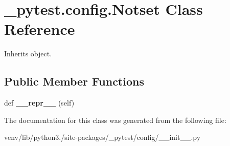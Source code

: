 \hypertarget{class__pytest_1_1config_1_1_notset}{}\section{\+\_\+pytest.\+config.\+Notset Class Reference}
\label{class__pytest_1_1config_1_1_notset}


Inherits object.

\subsection*{Public Member Functions}
\begin{DoxyCompactItemize}
\item 
\mbox{\label{class__pytest_1_1config_1_1_notset_ac13b0907cd677db6e1eb5079e9d0e6be}} 
def {\bfseries \+\_\+\+\_\+repr\+\_\+\+\_\+} (self)
\end{DoxyCompactItemize}


The documentation for this class was generated from the following file\+:\begin{DoxyCompactItemize}
\item 
venv/lib/python3./site-\/packages/\+\_\+pytest/config/\+\_\+\+\_\+init\+\_\+\+\_\+.\+py\end{DoxyCompactItemize}
